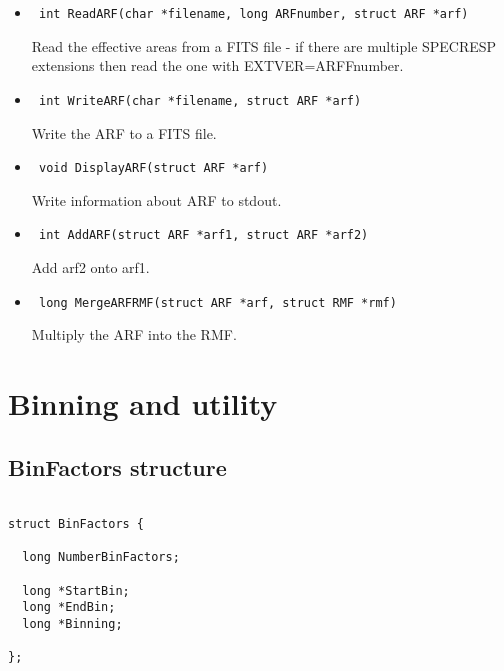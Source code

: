 \documentclass[11pt]{book}
\begin{document}
\begin{itemize}

\item      \begin{verbatim} int ReadARF(char *filename, long ARFnumber, struct ARF *arf)\end{verbatim}

               Read the effective areas from a FITS file - if there
               are multiple SPECRESP extensions then read the one with
               EXTVER=ARFFnumber.

\item      \begin{verbatim} int WriteARF(char *filename, struct ARF *arf)\end{verbatim}

               Write the ARF to a FITS file.

\item      \begin{verbatim} void DisplayARF(struct ARF *arf)\end{verbatim}

               Write information about ARF to stdout.

\item      \begin{verbatim} int AddARF(struct ARF *arf1, struct ARF *arf2)\end{verbatim}

               Add arf2 onto arf1.

\item      \begin{verbatim} long MergeARFRMF(struct ARF *arf, struct RMF *rmf)\end{verbatim}

               Multiply the ARF into the RMF.

\end{itemize}

\section{Binning and utility}

\subsection{BinFactors structure}

\begin{verbatim}

struct BinFactors {

  long NumberBinFactors;

  long *StartBin;
  long *EndBin;
  long *Binning;

};

\end{verbatim}
\end{document}
